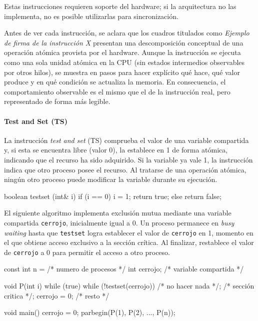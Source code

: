 Estas instrucciones requieren soporte del hardware; si la arquitectura no las implementa, no es posible utilizarlas para sincronización.

Antes de ver cada instrucción, se aclara que los cuadros titulados como \emph{Ejemplo de firma de la instrucción X} presentan una descomposición conceptual de una operación atómica provista por el hardware. Aunque la instrucción se ejecuta como una sola unidad atómica en la CPU (sin estados intermedios observables por otros hilos), se muestra en pasos para hacer explícito qué hace, qué valor produce y en qué condición se actualiza la memoria. En consecuencia, el comportamiento observable es el mismo que el de la instrucción real, pero representado de forma más legible.

\paragraph{Test and Set (TS)}
La instrucción \textit{test and set} (TS) comprueba el valor de una variable compartida y, si esta se encuentra libre (valor 0), la establece en 1 de forma atómica, indicando que el recurso ha sido adquirido. Si la variable ya vale 1, la instrucción indica que otro proceso posee el recurso. Al tratarse de una operación atómica, ningún otro proceso puede modificar la variable durante su ejecución.

\begin{ccode}[title=Ejemplo de firma de la instrucción TS]
boolean testset (int& i) {
  if (i == 0) {
    i = 1;
    return true;
  } else {
    return false;
  }
}
\end{ccode}
El siguiente algoritmo implementa exclusión mutua mediante una variable compartida \texttt{cerrojo}, inicialmente igual a 0. Un proceso permanece en \textit{busy waiting} hasta que \texttt{testset} logra establecer el valor de \texttt{cerrojo} en 1, momento en el que obtiene acceso exclusivo a la sección crítica. Al finalizar, restablece el valor de \texttt{cerrojo} a 0 para permitir el acceso a otro proceso.

\begin{ccode}[title=Exclusión mutua usando TS]
const int n = /* numero de procesos */
int cerrojo; /* variable compartida */

void P(int i) {
  while (true) {
    while (!testset(cerrojo)) {
      /* no hacer nada */;
    }
    /* sección critica */;
    cerrojo = 0;
    /* resto */
  }
}

void main() {
  cerrojo = 0;
  parbegin(P(1), P(2), ..., P(n));
}
\end{ccode}

